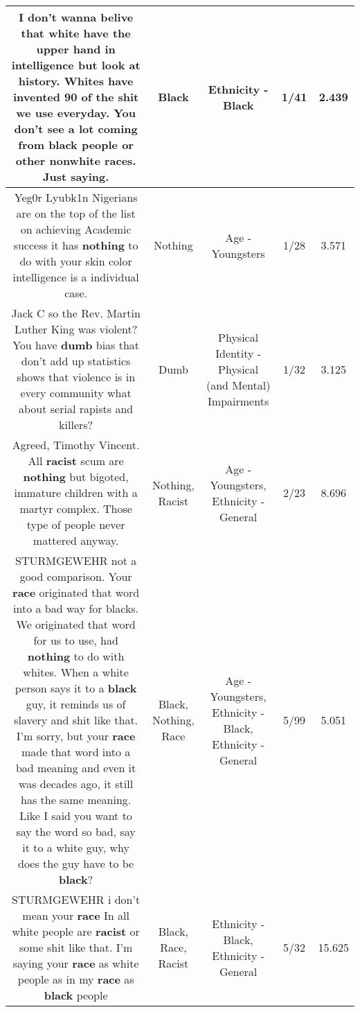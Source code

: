 \documentclass[11pt]{article}
\newlength\mylength
\begin{document}
\begin{center}
\begin{longtable}{|C{.65\mylength}|C{.30\mylength}|C{.12\mylength}|C{.12\mylength}|C{.12\mylength}|}
  \small I don't wanna belive that white have the upper hand in intelligence but look at history. Whites have invented 90 of the shit we use everyday. You don't see a lot coming from \textbf{black} people or other nonwhite races. Just saying.\normalsize   & Black & Ethnicity - Black & 1/41 & 2.439 \\  \hline
  \small Yeg0r Lyubk1n Nigerians are on the top of the list on achieving Academic success it has \textbf{nothing} to do with your skin color intelligence is a individual case.\normalsize   & Nothing & Age - Youngsters & 1/28 & 3.571 \\  \hline
  \small Jack C so the Rev. Martin Luther King was violent?  You have \textbf{dumb} bias that don't add up statistics shows that violence is in every community what about serial rapists and killers?\normalsize   & Dumb & Physical Identity - Physical (and Mental) Impairments & 1/32 & 3.125 \\  \hline
  \small Agreed, Timothy Vincent. All \textbf{racist} scum are \textbf{nothing} but bigoted, immature children with a martyr complex. Those type of people never mattered anyway.\normalsize   & Nothing, Racist & Age - Youngsters, Ethnicity - General & 2/23 & 8.696 \\  \hline
  \small STURMGEWEHR   not a good comparison. Your \textbf{race} originated that word into a bad way for blacks. We originated that word for us to use, had \textbf{nothing} to do with whites. When a white person says it to a \textbf{black} guy, it reminds us of slavery and shit like that. I'm sorry, but your \textbf{race} made that word into a bad meaning and even it was decades ago, it still has the same meaning. Like I said you want to say the word so bad, say it to a white guy, why does the guy have to be \textbf{black}?\normalsize   & Black, Nothing, Race & Age - Youngsters, Ethnicity - Black, Ethnicity - General & 5/99 & 5.051 \\  \hline
  \small STURMGEWEHR   i don't mean your \textbf{race} In all white people are \textbf{racist} or some shit like that. I'm saying your \textbf{race} as white people as in my \textbf{race} as \textbf{black} people\normalsize   & Black, Race, Racist & Ethnicity - Black, Ethnicity - General & 5/32 & 15.625 \\  \hline

\end{longtable}
\end{center}
\end{document}
